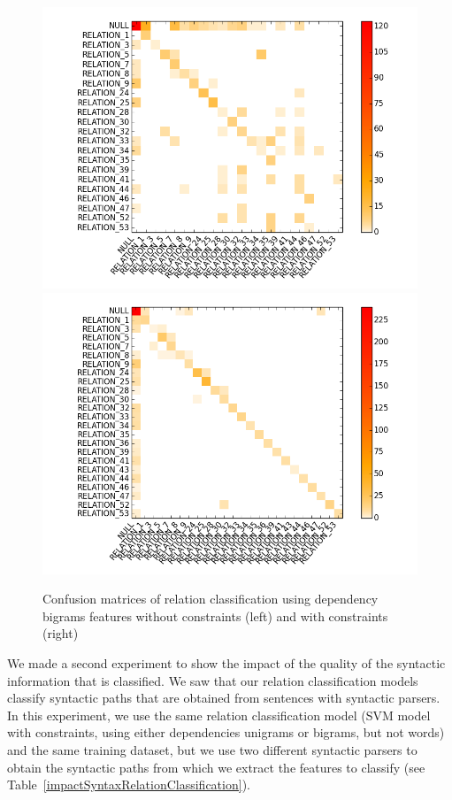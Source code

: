 \documentclass[12pt]{article}
\begin{document}
\begin{figure}[!ht]
   \centering
   \includegraphics[width=0.5\linewidth]{Figures/Confusion_Matrices/confusionMatrixRelationClassification_noConstraints.png}\hfill
   \includegraphics[width=0.5\linewidth]{Figures/Confusion_Matrices/confusionMatrixRelationClassification_constraints.png}
   \caption{\label{relationConfusion} Confusion matrices of relation classification using dependency bigrams features without constraints (left) and with constraints (right)}
\end{figure}

We made a second experiment to show the impact of the quality of the syntactic information that is classified. We saw that our relation classification models classify syntactic paths that are obtained from sentences with syntactic parsers. In this experiment, we use the same relation classification model (SVM model with constraints, using either dependencies unigrams or bigrams, but not words) and the same training dataset, but we use two different syntactic parsers to obtain the syntactic paths from which we extract the features to classify (see Table~\ref{impactSyntaxRelationClassification}).
\end{document}

